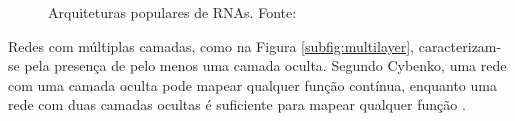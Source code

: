 \begin{figure}[h!]
     \hfill
     \hfill
     \caption{Arquiteturas populares de RNAs. Fonte: \cite{haykin}}
     \label{fig:activation}
\end{figure}

Redes com múltiplas camadas, como na Figura \ref{subfig:multilayer}, caracterizam-se pela presença de pelo menos uma camada oculta. Segundo Cybenko, uma rede com uma camada oculta pode mapear qualquer função contínua, enquanto uma rede com duas camadas ocultas é suficiente para mapear qualquer função \cite{cybenko}.

